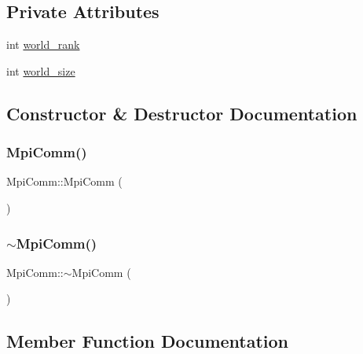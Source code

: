 \subsection*{Private Attributes}
\begin{DoxyCompactItemize}
\item 
int \mbox{\hyperlink{classMpiComm_acb84b9a6b593438b99c633933547ca09}{world\+\_\+rank}}
\item 
int \mbox{\hyperlink{classMpiComm_a2e1fb05065d45c4af5cf2c3a56a7687f}{world\+\_\+size}}
\end{DoxyCompactItemize}


\subsection{Constructor \& Destructor Documentation}
\mbox{\label{classMpiComm_a5f3b643e2c276746cc21094ab4ba6db8}} 
\subsubsection{\texorpdfstring{Mpi\+Comm()}{MpiComm()}}
{\footnotesize\ttfamily Mpi\+Comm\+::\+Mpi\+Comm (\begin{DoxyParamCaption}{ }\end{DoxyParamCaption})\hspace{0.3cm}{\ttfamily [inline]}}

\mbox{\label{classMpiComm_afd95c093aeb063ee31de39a1a9104b5c}} 
\subsubsection{\texorpdfstring{$\sim$\+Mpi\+Comm()}{~MpiComm()}}
{\footnotesize\ttfamily Mpi\+Comm\+::$\sim$\+Mpi\+Comm (\begin{DoxyParamCaption}{ }\end{DoxyParamCaption})\hspace{0.3cm}{\ttfamily [inline]}}



\subsection{Member Function Documentation}
\mbox{\label{classMpiComm_a696c567ded2b842b368b82dee950de5b}} 
